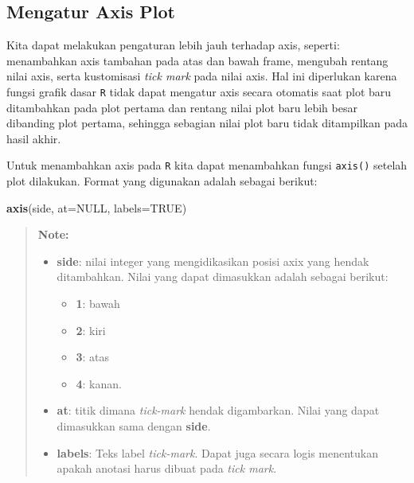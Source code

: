 \documentclass[]{book}
\newenvironment{Shaded}{\begin{snugshade}}{\end{snugshade}}
\newcommand{\KeywordTok}[1]{\textcolor[rgb]{0.13,0.29,0.53}{\textbf{#1}}}
\newcommand{\DataTypeTok}[1]{\textcolor[rgb]{0.13,0.29,0.53}{#1}}
\newcommand{\OtherTok}[1]{\textcolor[rgb]{0.56,0.35,0.01}{#1}}
\newcommand{\NormalTok}[1]{#1}
\providecommand{\tightlist}{%
  \setlength{\itemsep}{0pt}\setlength{\parskip}{0pt}}
\begin{document}
\subsection{Mengatur Axis Plot}\label{mengatur-axis-plot}

Kita dapat melakukan pengaturan lebih jauh terhadap axis, seperti:
menambahkan axis tambahan pada atas dan bawah frame, mengubah rentang
nilai axis, serta kustomisasi \emph{tick mark} pada nilai axis. Hal ini
diperlukan karena fungsi grafik dasar \texttt{R} tidak dapat mengatur
axis secara otomatis saat plot baru ditambahkan pada plot pertama dan
rentang nilai plot baru lebih besar dibanding plot pertama, sehingga
sebagian nilai plot baru tidak ditampilkan pada hasil akhir.

Untuk menambahkan axis pada \texttt{R} kita dapat menambahkan fungsi
\texttt{axis()} setelah plot dilakukan. Format yang digunakan adalah
sebagai berikut:

\begin{Shaded}
\begin{Highlighting}[]
\KeywordTok{axis}\NormalTok{(side, }\DataTypeTok{at=}\OtherTok{NULL}\NormalTok{, }\DataTypeTok{labels=}\OtherTok{TRUE}\NormalTok{)}
\end{Highlighting}
\end{Shaded}

\begin{quote}
\textbf{Note: }

\begin{itemize}
\tightlist
\item
  \textbf{side}: nilai integer yang mengidikasikan posisi axix yang
  hendak ditambahkan. Nilai yang dapat dimasukkan adalah sebagai
  berikut:

  \begin{itemize}
  \tightlist
  \item
    \textbf{1}: bawah
  \item
    \textbf{2}: kiri
  \item
    \textbf{3}: atas
  \item
    \textbf{4}: kanan.
  \end{itemize}
\item
  \textbf{at}: titik dimana \emph{tick-mark} hendak digambarkan. Nilai
  yang dapat dimasukkan sama dengan \textbf{side}.
\item
  \textbf{labels}: Teks label \emph{tick-mark}. Dapat juga secara logis
  menentukan apakah anotasi harus dibuat pada \emph{tick mark}.
\end{itemize}
\end{quote}
\end{document}
